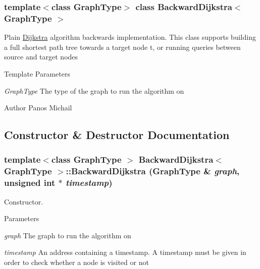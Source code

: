 \subsubsection*{template$<$class GraphType$>$ class BackwardDijkstra$<$ GraphType $>$}

Plain \hyperlink{class_dijkstra}{Dijkstra} algorithm backwards implementation. This class supports building a full shortest path tree towards a target node t, or running queries between source and target nodes


\begin{DoxyTemplParams}{Template Parameters}
\item[{\em GraphType}]The type of the graph to run the algorithm on \end{DoxyTemplParams}
\begin{DoxyAuthor}{Author}
Panos Michail 
\end{DoxyAuthor}


\subsection{Constructor \& Destructor Documentation}
\hypertarget{class_backward_dijkstra_a992f46940cf6d789152204e16032c149}{
\subsubsection[{BackwardDijkstra}]{\setlength{\rightskip}{0pt plus 5cm}template$<$class GraphType $>$ {\bf BackwardDijkstra}$<$ GraphType $>$::{\bf BackwardDijkstra} (GraphType \& {\em graph}, \/  unsigned int $\ast$ {\em timestamp})}}
\label{class_backward_dijkstra_a992f46940cf6d789152204e16032c149}


Constructor. 


\begin{DoxyParams}{Parameters}
\item[{\em graph}]The graph to run the algorithm on \item[{\em timestamp}]An address containing a timestamp. A timestamp must be given in order to check whether a node is visited or not \end{DoxyParams}



